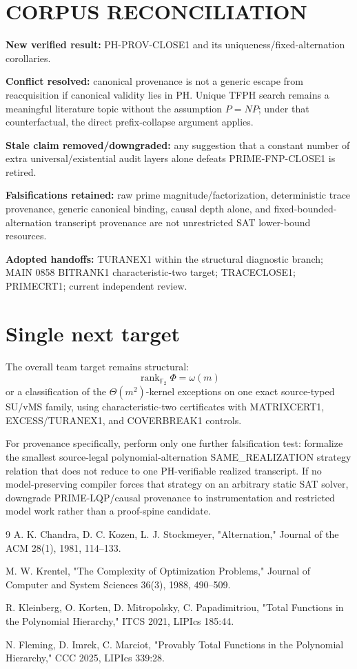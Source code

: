 \documentclass[11pt]{article}
\begin{document}
\section*{CORPUS RECONCILIATION}
\textbf{New verified result:} PH-PROV-CLOSE1 and its uniqueness/fixed-alternation corollaries.

\textbf{Conflict resolved:} canonical provenance is not a generic escape from reacquisition if
canonical validity lies in PH. Unique TFPH search remains a meaningful literature topic without the
assumption \(P=NP\); under that counterfactual, the direct prefix-collapse argument applies.

\textbf{Stale claim removed/downgraded:} any suggestion that a constant number of extra
universal/existential audit layers alone defeats PRIME-FNP-CLOSE1 is retired.

\textbf{Falsifications retained:} raw prime magnitude/factorization, deterministic trace
provenance, generic canonical binding, causal depth alone, and fixed-bounded-alternation transcript
provenance are not unrestricted SAT lower-bound resources.

\textbf{Adopted handoffs:} TURANEX1 within the structural diagnostic branch; MAIN 0858 BITRANK1
characteristic-two target; TRACECLOSE1; PRIMECRT1; current independent review.

\section*{Single next target}
The overall team target remains structural:
\[
\boxed{\operatorname{rank}_{\mathbb F_2}\Phi=\omega(m)}
\]
or a classification of the \(\Theta(m^2)\)-kernel exceptions on one exact source-typed SU/vMS
family, using characteristic-two certificates with MATRIXCERT1, EXCESS/TURANEX1, and COVERBREAK1
controls.

For provenance specifically, perform only one further falsification test: formalize the smallest
source-legal polynomial-alternation SAME\_REALIZATION strategy relation that does not reduce to one
PH-verifiable realized transcript. If no model-preserving compiler forces that strategy on an
arbitrary static SAT solver, downgrade PRIME-LQP/causal provenance to instrumentation and restricted
model work rather than a proof-spine candidate.

\begin{thebibliography}{9}
A. K. Chandra, D. C. Kozen, L. J. Stockmeyer,
"Alternation," Journal of the ACM 28(1), 1981, 114--133.

M. W. Krentel,
"The Complexity of Optimization Problems,"
Journal of Computer and System Sciences 36(3), 1988, 490--509.

R. Kleinberg, O. Korten, D. Mitropolsky, C. Papadimitriou,
"Total Functions in the Polynomial Hierarchy,"
ITCS 2021, LIPIcs 185:44.

N. Fleming, D. Imrek, C. Marciot,
"Provably Total Functions in the Polynomial Hierarchy,"
CCC 2025, LIPIcs 339:28.
\end{thebibliography}
\end{document}
